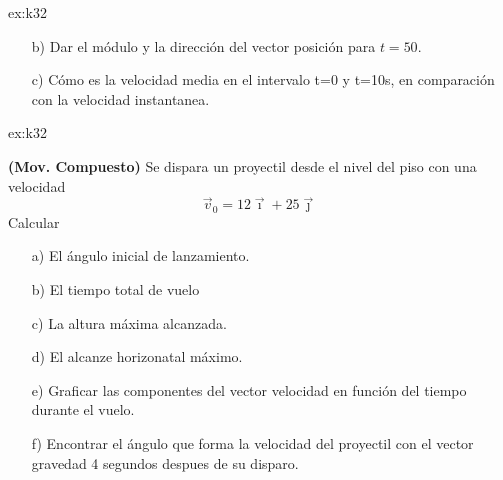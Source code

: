 \begin{multicols}{2}
\begin{excercise}[][][]{ex:k32}
{\begin{itemize}
            \item[b)] Dar el módulo y la dirección del vector posición para $t=50$.
             \item[c)] Cómo es la velocidad media en el intervalo t=0 y t=10s, en comparación con la velocidad instantanea.
         \end{itemize}
         }
    \end{excercise}
    \begin{excercise}[][][a) $\theta=64.4^\circ$, b) $t_v=5.01\ s$ , c) $H=31.86\ m$, d) $R=141.3\ m$, f) $\gamma=38.66^\circ$]{ex:k32}{
        \textbf{(Mov. Compuesto)}
        Se dispara un proyectil desde el nivel del piso con una velocidad
        \begin{equation*}
            \vec{v}_0=12\vec{\imath}+25\vec{\jmath}
        \end{equation*}
        Calcular 
        \begin{itemize}
            \item[a)] El ángulo inicial de lanzamiento.
            \item[b)] El tiempo total de vuelo
            \item[c)] La altura máxima alcanzada.
            \item[d)] El alcanze horizonatal máximo.
            \item[e)] Graficar las componentes del vector velocidad en función del tiempo durante el vuelo.
            \item[f)] Encontrar el ángulo que forma la velocidad del proyectil con el vector gravedad 4 segundos despues de su disparo.
         \end{itemize}
         }
    \end{excercise}

\end{multicols}
